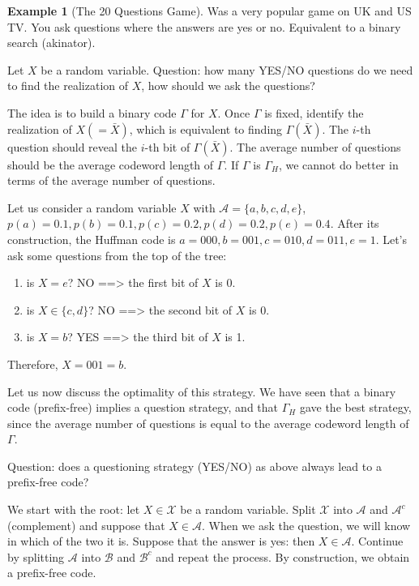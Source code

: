 \documentclass{report}
\theoremstyle{plain}
\theoremstyle{definition}
\newtheorem{exmp}[thm]{Example}
\theoremstyle{remark}
\begin{document}
\begin{exmp}[The 20 Questions Game]
	Was a very popular game on UK and US TV. You ask questions where the answers are yes or no. Equivalent to a binary search (akinator). \par
	Let $X$ be a random variable. Question: how many YES/NO questions do we need to find the realization of $X$, how should we ask the questions? \par
	The idea is to build a binary code $\Gamma$ for $X$. Once $\Gamma$ is fixed, identify the realization of $X (= \bar X)$, which is equivalent to finding $\Gamma(\bar X)$. The $i$-th question should reveal the $i$-th bit of $\Gamma(\bar X)$. The average number of questions should be the average codeword length of $\Gamma$. If $\Gamma$ is $\Gamma_H$, we cannot do better in terms of the average number of questions. \par
	Let us consider a random variable $X$ with $\mathcal A = \{a, b, c, d, e\}$, $p(a) = 0.1, p(b) = 0.1, p(c) = 0.2, p(d) = 0.2, p(e) = 0.4$. After its construction, the Huffman code is $a = 000, b = 001, c = 010, d = 011, e = 1$. Let's ask some questions from the top of the tree:
	\begin{enumerate}
		\item is $X = e$? NO ==> the first bit of $X$ is 0.
		\item is $X \in \{c, d\}$? NO ==> the second bit of $X$ is 0.
		\item is $X = b$? YES ==> the third bit of $X$ is 1.
	\end{enumerate}
	Therefore, $X = 001 = b$. \par
	Let us now discuss the optimality of this strategy. We have seen that a binary code (prefix-free) implies a question strategy, and that $\Gamma_H$ gave the best strategy, since the average number of questions is equal to the average codeword length of $\Gamma$. \par
	Question: does a questioning strategy (YES/NO) as above always lead to a prefix-free code? \par
	We start with the root: let $X \in \mathcal X$ be a random variable. Split $\mathcal X$ into $\mathcal A$ and $\mathcal A^c$ (complement) and suppose that $X \in \mathcal A$. When we ask the question, we will know in which of the two it is. Suppose that the answer is yes: then $X \in \mathcal A$. Continue by splitting $\mathcal A$ into $\mathcal B$ and $\mathcal B^c$ and repeat the process. By construction, we obtain a prefix-free code.
\end{exmp}
\end{document}
